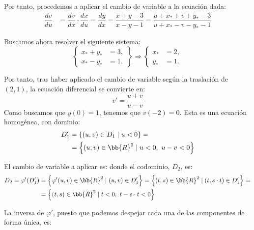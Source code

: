 \begin{ejercicio}
    Por tanto, procedemos a aplicar el cambio de variable a la ecuación dada:
    \begin{align*}
        \dfrac{dv}{du} &= \dfrac{dv}{dx}\cdot \dfrac{dx}{du} = \dfrac{dy}{dx} = \dfrac{x + y - 3}{x - y - 1} = \dfrac{u+x_\ast + v+y_\ast - 3}{u+x_\ast - v-y_\ast - 1}
    \end{align*}

    Buscamos ahora resolver el siguiente sistema:
    \begin{equation*}
        \left\{
            \begin{aligned}
                x_\ast +y_\ast &= 3,\\
                x_\ast -y_\ast &= 1.
            \end{aligned}
        \right\}\Longrightarrow
        \left\{
            \begin{aligned}
                x_\ast &= 2,\\
                y_\ast &= 1.
            \end{aligned}
        \right.
    \end{equation*}

    Por tanto, tras haber aplicado el cambio de variable según la traslación de $(2,1)$, la ecuación diferencial se convierte en:
    \begin{equation*}
        v' = \dfrac{u + v}{u - v}
    \end{equation*}
    Como buscamos que $y(0)=1$, tenemos que $v(-2)=0$.
    Esta es una ecuación homogénea, con dominio:
    \begin{align*}
        D_1'&=\left\{(u,v)\in D_1\mid u<0\right\}=\\
        &= \left\{(u,v)\in \bb{R}^2 \mid u<0,~u-v<0\right\}
    \end{align*}
    
    El cambio de variable a aplicar es:
    donde el codominio, $D_2$, es:
    \begin{align*}
        D_2=\varphi'(D_1')&=\left\{\varphi'(u,v)\in \bb{R}^2 \mid (u,v)\in D_1'\right\} = \left\{(t,s)\in \bb{R}^2 \mid (t, s\cdot t)\in D_1'\right\} =\\
        &= \left\{(t,s)\in \bb{R}^2 \mid t<0,~t-s\cdot t<0\right\}
    \end{align*}

    La inversa de $\varphi'$, puesto que podemos despejar cada una de las componentes de forma única, es:


\end{ejercicio}
